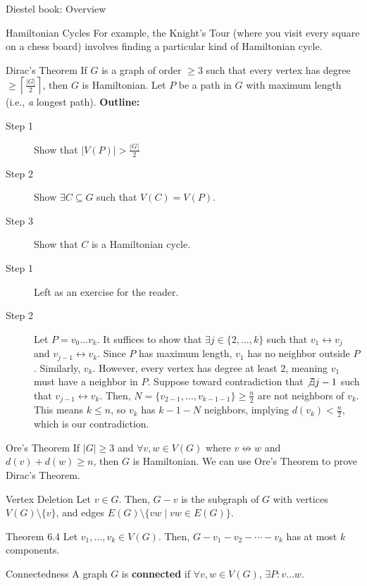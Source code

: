 \documentclass[10pt]{extarticle}
\begin{document}
{\begin{problem}{Diestel book: Overview}
\begin{problem}{Hamiltonian Cycles}
      For example, the Knight's Tour (where you visit every square on a chess board) involves finding a particular kind of Hamiltonian cycle. 
    \end{problem}
    \begin{problem}{Dirac's Theorem}
      If $G$ is a graph of order $\geq 3$ such that every vertex has degree $\geq \left\lceil\frac{|G|}{2}\right\rceil$, then $G$ is Hamiltonian.
      \tcblower
      Let $P$ be a path in $G$ with maximum length (i.e., \textit{a} longest path).
      \textbf{Outline:}
      \begin{description}
        \item[Step 1] Show that $|V(P)| > \frac{|G|}{2}$
        \item[Step 2] Show $\exists C\subseteq G$ such that $V(C) = V(P)$.
        \item[Step 3] Show that $C$ is a Hamiltonian cycle.
      \end{description}
      \begin{description}
        \item[Step 1] Left as an exercise for the reader.
        \item[Step 2] Let $P=v_0\dots v_k$. It suffices to show that $\exists j\in \{2,\dots,k\}$ such that $v_1\leftrightarrow v_j$ and $v_{j-1} \leftrightarrow v_k$. Since $P$ has maximum length, $v_1$ has no neighbor outside $P$. Similarly, $v_k$. However, every vertex has degree at least $2$, meaning $v_1$ must have a neighbor in $P$. Suppose toward contradiction that $\not\exists j-1$ such that $v_{j-1} \leftrightarrow v_k$. Then, $N = \{v_{2-1},\dots,v_{k-1-1}\}\geq \frac{n}{2}$ are not neighbors of $v_k$. This means $k\leq n$, so $v_k$ has $k-1-N$ neighbors, implying $d(v_k) < \frac{n}{2}$, which is our contradiction.
      \end{description}
    \end{problem}
    \begin{problem}{Ore's Theorem}
      If $|G| \geq 3$ and $\forall v,w\in V(G)$ where $v \not\leftrightarrow w$ and $d(v) + d(w) \geq n$, then $G$ is Hamiltonian.
      \tcblower
      We can use Ore's Theorem to prove Dirac's Theorem.
    \end{problem}
    \begin{problem}{Vertex Deletion}
      Let $v\in G$. Then, $G-v$ is the subgraph of $G$ with vertices $V(G)\setminus \{v\}$, and edges $E(G)\setminus \{vw\mid vw\in E(G)\}$.
    \end{problem}
    \begin{problem}{Theorem 6.4}
      Let $v_1,\dots,v_k\in V(G)$. Then, $G-v_1-v_2-\cdots-v_k$ has at most $k$ components.
      \begin{problem}{Connectedness}
        A graph $G$ is \textbf{connected} if $\forall v,w\in V(G)$, $\exists P: v\dots w$.
      \end{problem}
    \end{problem}
  \end{problem}
}
\end{document}
